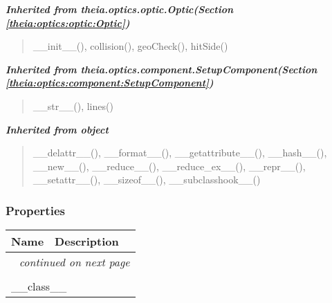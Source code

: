 \large{\textbf{\textit{Inherited from theia.optics.optic.Optic\textit{(Section \ref{theia:optics:optic:Optic})}}}}

\begin{quote}
\_\_init\_\_(), collision(), geoCheck(), hitSide()
\end{quote}

\large{\textbf{\textit{Inherited from theia.optics.component.SetupComponent\textit{(Section \ref{theia:optics:component:SetupComponent})}}}}

\begin{quote}
\_\_str\_\_(), lines()
\end{quote}

\large{\textbf{\textit{Inherited from object}}}

\begin{quote}
\_\_delattr\_\_(), \_\_format\_\_(), \_\_getattribute\_\_(), \_\_hash\_\_(), \_\_new\_\_(), \_\_reduce\_\_(), \_\_reduce\_ex\_\_(), \_\_repr\_\_(), \_\_setattr\_\_(), \_\_sizeof\_\_(), \_\_subclasshook\_\_()
\end{quote}


  \subsubsection{Properties}

    \vspace{-1cm}
\hspace{\varindent}\begin{longtable}{|p{\varnamewidth}|p{\vardescrwidth}|l}
\cline{1-2}
\cline{1-2} \centering \textbf{Name} & \centering \textbf{Description}& \\
\cline{1-2}
\endhead\cline{1-2}\multicolumn{3}{r}{\small\textit{continued on next page}}\\\endfoot\cline{1-2}
\endlastfoot\multicolumn{2}{|l|}{\textit{Inherited from object}}\\
\multicolumn{2}{|p{\varwidth}|}{\raggedright \_\_class\_\_}\\
\cline{1-2}
\end{longtable}



